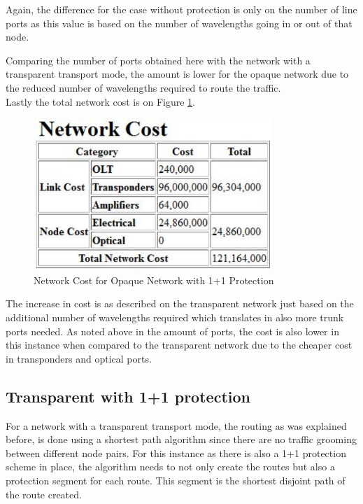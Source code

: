 	Again, the difference for the case without protection is only on the number of line ports as this value is based on the number of wavelengths going in or out of that node.
	
	Comparing the number of ports obtained here with the network with a transparent transport mode, the amount is lower for the opaque network due to the reduced number of wavelengths required to route the traffic. \\
	
	Lastly the total network cost is on Figure \ref{networkCost_Report_Cost_Opaque11}.\\
	
	\begin{figure}[!h]
		\centering
		\includegraphics[width=9cm]{networkCost_Report_Cost_Opaque11.pdf}	
		\caption{Network Cost for Opaque Network with 1+1 Protection}
		\label{networkCost_Report_Cost_Opaque11}								
	\end{figure}	
	
	\pagebreak
	
	The increase in cost is as described on the transparent network just based on the additional number of wavelengths required which translates in also more trunk ports needed. As noted above in the amount of ports, the cost is also lower in this instance when compared to the transparent network due to the cheaper cost in transponders and optical ports.
	
	
	
		\subsection{Transparent with 1+1 protection}
		
		
		For a network with a transparent transport mode, the routing as was explained before, is done using a shortest path algorithm since there are no traffic grooming between different node pairs. For this instance as there is also a 1+1 protection scheme in place, the algorithm needs to not only create the routes but also a protection segment for each route. This segment is the shortest disjoint path of the route created.

